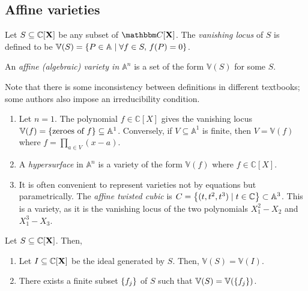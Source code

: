 \subsection{Affine varieties}
\begin{definition}
    Let \( S \subseteq \mathbb C[\vb X] \) be any subset of \( \mathbbm C[\vb X] \).
    The \emph{vanishing locus} of \( S \) is defined to be \( \mathbb V(S) = \qty{P \in \mathbb A \mid \forall f \in S,\, f(P) = 0} \).
\end{definition}
\begin{definition}
    An \emph{affine (algebraic) variety in \( \mathbb A^n \)} is a set of the form \( \mathbb V(S) \) for some \( S \).
\end{definition}
Note that there is some inconsistency between definitions in different textbooks; some authors also impose an irreducibility condition.
\begin{example}
    \begin{enumerate}
        \item Let \( n = 1 \).
        The polynomial \( f \in \mathbb C[X] \) gives the vanishing locus \( \mathbb V(f) = \qty{\text{zeroes of } f} \subseteq \mathbb A^1 \).
        Conversely, if \( V \subseteq \mathbb A^1 \) is finite, then \( V = \mathbb V(f) \) where \( f = \prod_{a \in V} (x - a) \).
        \item A \emph{hypersurface} in \( \mathbb A^n \) is a variety of the form \( \mathbb V(f) \) where \( f \in \mathbb C[X] \).
        \item It is often convenient to represent varieties not by equations but parametrically.
        The \emph{affine twisted cubic} is \( C = \qty{(t, t^2, t^3) \mid t \in \mathbb C} \subset \mathbb A^3 \).
        This is a variety, as it is the vanishing locus of the two polynomials \( X_1^2 - X_2 \) and \( X_1^3 - X_3 \).
    \end{enumerate}
\end{example}
\begin{theorem}
    Let \( S \subseteq \mathbb C[\vb X] \).
    Then,
    \begin{enumerate}
        \item Let \( I \subseteq \mathbb C[\vb X] \) be the ideal generated by \( S \).
        Then, \( \mathbb V(S) = \mathbb V(I) \).
        \item There exists a finite subset \( \qty{f_j} \) of \( S \) such that \( \mathbb V(S) = \mathbb V(\qty{f_j}) \).
    \end{enumerate}
\end{theorem}
